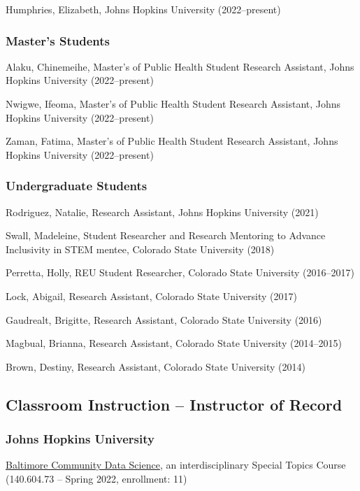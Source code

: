 \documentclass{cv}
\begin{document}
Humphries, Elizabeth, Johns Hopkins University (2022--present)

\subsubsection*{Master's Students}

Alaku, Chinemeihe, Master's of Public Health Student Research Assistant, Johns Hopkins University (2022--present)

Nwigwe, Ifeoma, Master's of Public Health Student Research Assistant, Johns Hopkins University (2022--present)

Zaman, Fatima, Master's of Public Health Student Research Assistant, Johns Hopkins University (2022--present)

\subsubsection*{Undergraduate Students}

Rodriguez, Natalie, Research Assistant, Johns Hopkins University (2021)

Swall, Madeleine, Student Researcher and Research Mentoring to Advance Inclusivity in STEM mentee, Colorado State University (2018)

Perretta, Holly, REU Student Researcher, Colorado State University (2016--2017)

Lock, Abigail, Research Assistant, Colorado State University (2017)

Gaudrealt, Brigitte, Research Assistant, Colorado State University (2016)

Magbual, Brianna, Research Assistant, Colorado State University (2014--2015)

Brown, Destiny, Research Assistant, Colorado State University (2014)

\subsection*{Classroom Instruction -- Instructor of Record}

\subsubsection*{Johns Hopkins University}

\href{https://jhudatascience.org/Baltimore_Community_Course/index.html}{Baltimore Community Data Science}, an interdisciplinary Special Topics Course (140.604.73 -- Spring 2022, enrollment: 11)
\end{document}
